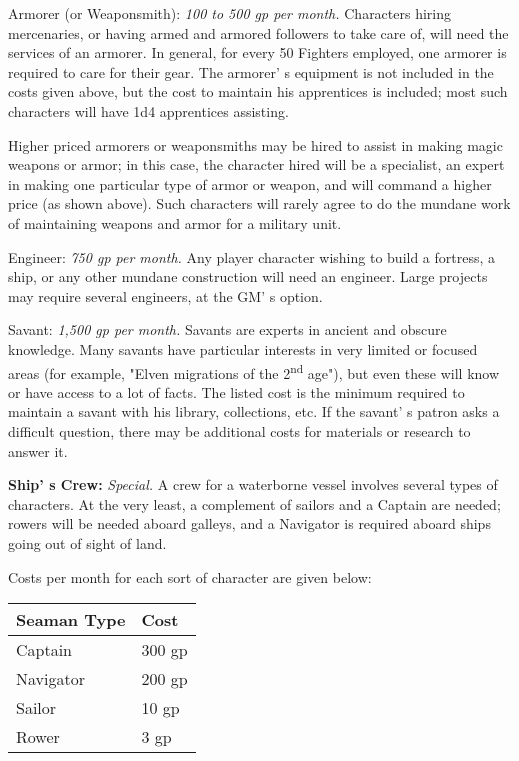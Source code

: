 \documentclass[a4paper,twoside,openany,10pt]{book}
\begin{document}
\begin{multicols}{2}
Armorer (or \hypertarget{Weaponsmithux20Entry}{}{}\label{Weaponsmithux20Entry}Weaponsmith): \emph{100 to 500 gp per month.} Characters hiring mercenaries, or having armed and armored followers to take care of, will need the services of an armorer. In general, for every 50 Fighters employed, one armorer is required to care for their gear. The armorer' s equipment is not included in the costs given above, but the cost to maintain his apprentices is included; most such characters will have 1d4 apprentices assisting.

Higher priced armorers or weaponsmiths may be hired to assist in making magic weapons or armor; in this case, the character hired will be a specialist, an expert in making one particular type of armor or weapon, and will command a higher price (as shown above). Such characters will rarely agree to do the mundane work of maintaining weapons and armor for a military unit.

Engineer: \emph{750 gp per month.} Any player character wishing to build a fortress, a ship, or any other mundane construction will need an engineer. Large projects may require several engineers, at the GM' s option.

Savant: \emph{1,500 gp per month.} Savants are experts in ancient and obscure knowledge. Many savants have particular interests in very limited or focused areas (for example, "Elven migrations of the 2\textsuperscript{nd} age"), but even these will know or have access to a lot of facts. The listed cost is the minimum required to maintain a savant with his library, collections, etc. If the savant' s patron asks a difficult question, there may be additional costs for materials or research to answer it.

\textbf{Ship' s Crew:} \emph{Special.} A crew for a waterborne vessel involves several types of characters. At the very least, a complement of sailors and a Captain are needed; rowers will be needed aboard galleys, and a Navigator is required aboard ships going out of sight of land.

Costs per month for each sort of character are given below:\medskip

\begin{tabular*}{0.93\linewidth}{@{\extracolsep{\fill}}ll}
\textbf{Seaman Type} & \textbf{Cost} \\\toprule
Captain & 300 gp \\\hline
Navigator & 200 gp \\\hline
Sailor & 10 gp \\\hline
Rower & 3 gp \\\bottomrule
\end{tabular*}\medskip


\end{multicols}
\end{document}
